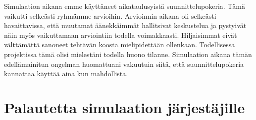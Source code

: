 \documentclass[a4paper]{article}
\begin{document}
Simulaation aikana emme käyttäneet aikataulusyistä suunnittelupokeria. Tämä vaikutti selkeästi ryhmämme arvioihin. Arvioinnin aikana oli selkeästi havaittavissa, että muutamat äänekkäimmät hallitsivat keskustelua ja pystyivät näin myös vaikuttamaan arviointiin todella voimakkaasti. Hiljaisimmat eivät välttämättä sanoneet tehtävän koosta mielipidettään ollenkaan. Todellisessa projektissa tämä olisi mielestäni todella huono tilanne. Simulaation aikana tämän edellämainitun ongelman huomattuani vakuutuin siitä, että suunnittelupokeria kannattaa käyttää aina kun mahdollista.



\section{Palautetta simulaation järjestäjille}
\end{document}
